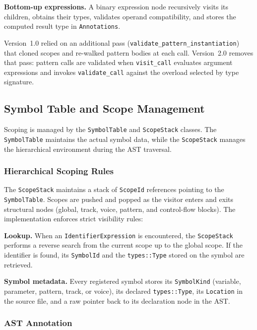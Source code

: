 \noindent \textbf{Bottom-up expressions.} A binary expression node recursively visits its children, obtains their
types, validates operand compatibility, and stores the computed result type in \texttt{Annotations}.

Version~1.0 relied on an additional pass (\texttt{validate\_pattern\_instantiation}) that cloned scopes and re-walked
pattern bodies at each call.
Version~2.0 removes that pass: pattern calls are validated when \texttt{visit\_call} evaluates argument expressions and
invokes \texttt{validate\_call} against the overload selected by type signature.

\subsection{Symbol Table and Scope Management}\label{detail-subsec:symbol-table-and-scope-management}

Scoping is managed by the \texttt{SymbolTable} and \texttt{ScopeStack} classes.
The \texttt{SymbolTable} maintains the actual symbol data, while the \texttt{ScopeStack} manages the hierarchical
environment during the AST traversal.

\subsubsection{Hierarchical Scoping Rules}

The \texttt{ScopeStack} maintains a stack of \texttt{ScopeId} references pointing to the \texttt{SymbolTable}.
Scopes are pushed and popped as the visitor enters and exits structural nodes (global, track, voice, pattern, and
control-flow blocks).
The implementation enforces strict visibility rules:

\noindent \textbf{Lookup.} When an \texttt{IdentifierExpression} is encountered, the \texttt{ScopeStack} performs a
reverse search from the current scope up to the global scope.
If the identifier is found, its \texttt{SymbolId} and the \texttt{types::Type} stored on the symbol are retrieved.

\noindent \textbf{Symbol metadata.} Every registered symbol stores its \texttt{SymbolKind} (variable, parameter,
pattern, track, or voice), its declared \texttt{types::Type}, its \texttt{Location} in the source file, and a raw
pointer back to its declaration node in the AST\@.

\subsubsection{AST Annotation}


